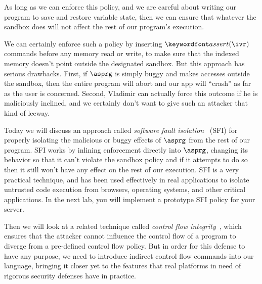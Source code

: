 \documentclass[11pt,twoside]{scrartcl}
\begin{document}
\begin{center}
\end{center}
As long as we can enforce this policy, and we are careful about writing our program to save and restore variable state, then we can ensure that whatever the sandbox does will not affect the rest of our program's execution.

We can certainly enforce such a policy by inserting $\passert{\ivr}$ commands before any memory read or write, to make sure that the indexed memory doesn't point outside the designated sandbox. But this approach has serious drawbacks. First, if $\asprg$ is simply buggy and makes accesses outside the sandbox, then the entire program will abort and our app will ``crash'' as far as the user is concerned. Second, Vladimir can actually force this outcome if he is maliciously inclined, and we certainly don't want to give such an attacker that kind of leeway.

Today we will discuss an approach called \emph{software fault isolation}~\cite{Sehr2010,Yee2009} (SFI) for properly isolating the malicious or buggy effects of $\asprg$ from the rest of our program. SFI works by inlining enforcement directly into $\asprg$, changing its behavior so that it can't violate the sandbox policy and if it attempts to do so then it still won't have any effect on the rest of our execution. SFI is a very practical technique, and has been used effectively in real applications to isolate untrusted code execution from browsers, operating systems, and other critical applications. In the next lab, you will implement a prototype SFI policy for your server.

Then we will look at a related technique called \emph{control flow integrity}~\cite{Abadi2009}, which ensures that the attacker cannot influence the control flow of a program to diverge from a pre-defined control flow policy. But in order for this defense to have any purpose, we need to introduce indirect control flow commands into our language, bringing it closer yet to the features that real platforms in need of rigorous security defenses have in practice.
\end{document}
